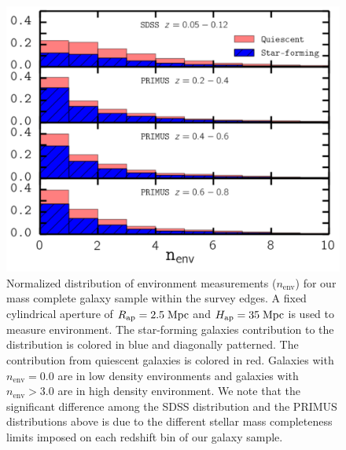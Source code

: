 \begin{figure}
\begin{center}
\includegraphics[width=\textwidth]{figs/qfenv/fig2.pdf}
\caption{Normalized distribution of environment measurements ($n_{\mathrm{env}}$) for our mass complete galaxy sample within the survey edges. A fixed cylindrical aperture of $R_{\mathrm{ap}} =2.5\;\mathrm{Mpc}$ and $H_{\mathrm{ap}} = 35\; \mathrm{Mpc}$ is used to measure environment. The star-forming galaxies contribution to the distribution is colored in blue and diagonally patterned. The contribution from quiescent galaxies is colored in red. Galaxies with $n_{\mathrm{env}} = 0.0$ are in low density environments and galaxies with $n_{\mathrm{env}} > 3.0$ are in high density environment. We note that the significant difference among the SDSS distribution and the PRIMUS distributions above is due to the different stellar mass completeness limits imposed on each redshift bin of our galaxy sample.}      \label{fig:envcount}
\end{center}
\end{figure}

